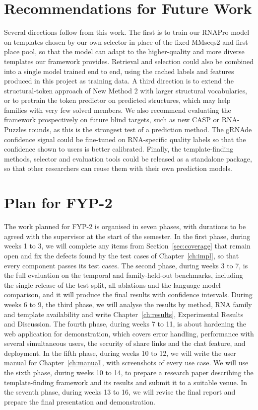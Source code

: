 \documentclass{FastFyp}
\begin{document}
\section{Recommendations for Future Work}
Several directions follow from this work. The first is to train our RNAPro model on templates chosen by our own selector in place of the fixed MMseqs2 and first-place pool, so that the model can adapt to the higher-quality and more diverse templates our framework provides. Retrieval and selection could also be combined into a single model trained end to end, using the cached labels and features produced in this project as training data. A third direction is to extend the structural-token approach of New Method 2 with larger structural vocabularies, or to pretrain the token predictor on predicted structures, which may help families with very few solved members. We also recommend evaluating the framework prospectively on future blind targets, such as new CASP or RNA-Puzzles rounds, as this is the strongest test of a prediction method. The gRNAde confidence signal could be fine-tuned on RNA-specific quality labels so that the confidence shown to users is better calibrated. Finally, the template-finding methods, selector and evaluation tools could be released as a standalone package, so that other researchers can reuse them with their own prediction models.

\section{Plan for FYP-2}
The work planned for FYP-2 is organised in seven phases, with durations to be agreed with the supervisor at the start of the semester. In the first phase, during weeks 1 to 3, we will complete any items from Section~\ref{sec:coverage} that remain open and fix the defects found by the test cases of Chapter~\ref{ch:impl}, so that every component passes its test cases. The second phase, during weeks 3 to 7, is the full evaluation on the temporal and family-held-out benchmarks, including the single release of the test split, all ablations and the language-model comparison, and it will produce the final results with confidence intervals. During weeks 6 to 9, the third phase, we will analyse the results by method, RNA family and template availability and write Chapter~\ref{ch:results}, Experimental Results and Discussion. The fourth phase, during weeks 7 to 11, is about hardening the web application for demonstration, which covers error handling, performance with several simultaneous users, the security of share links and the chat feature, and deployment. In the fifth phase, during weeks 10 to 12, we will write the user manual for Chapter~\ref{ch:manual}, with screenshots of every use case. We will use the sixth phase, during weeks 10 to 14, to prepare a research paper describing the template-finding framework and its results and submit it to a suitable venue. In the seventh phase, during weeks 13 to 16, we will revise the final report and prepare the final presentation and demonstration.
\end{document}
